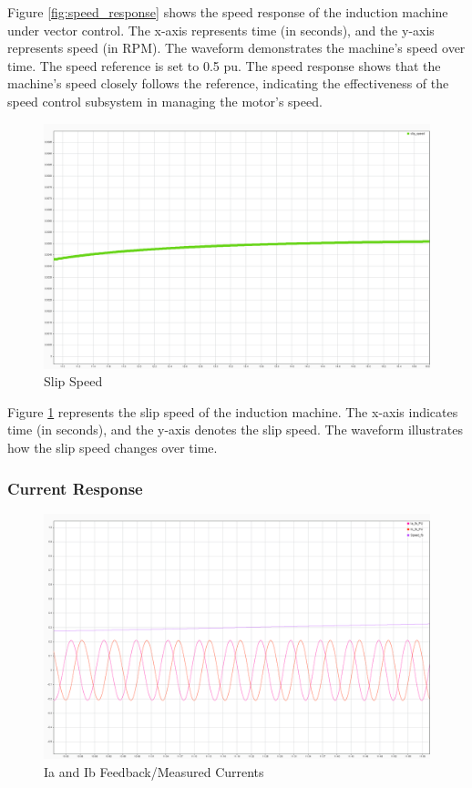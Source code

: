 Figure \ref{fig:speed_response} shows the speed response of the induction machine under vector control. The x-axis represents time (in seconds), and the y-axis represents speed (in RPM). The waveform demonstrates the machine's speed over time. The speed reference is set to 0.5 pu. The speed response shows that the machine's speed closely follows the reference, indicating the effectiveness of the speed control subsystem in managing the motor's speed.



\begin{figure}[H]
	\centering
	\includegraphics[width=6in]{sections/section3/images/simulationResutls/SlipSpeed.png}
	\caption{Slip Speed}
	\label{fig:slip_speed}
\end{figure}

Figure \ref{fig:slip_speed} represents the slip speed of the induction machine. The x-axis indicates time (in seconds), and the y-axis denotes the slip speed. The waveform illustrates how the slip speed changes over time. 





\subsubsection{Current Response}


\begin{figure}[H]
	\centering
	\includegraphics[width=6in]{sections/section3/images/simulationResutls/Ia_Ib_fb.png}
	\caption{Ia and Ib Feedback/Measured Currents}
	\label{fig:current_response_IA_IB}
\end{figure}

